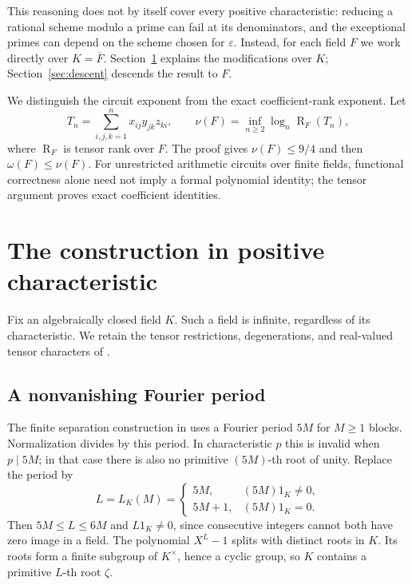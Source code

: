 \documentclass[11pt]{article}
\theoremstyle{remark}
\DeclareMathOperator{\rank}{R}
\newcommand{\eps}{\varepsilon}
\numberwithin{equation}{section}
\begin{document}
This reasoning does not by itself cover every positive characteristic:
reducing a rational scheme modulo a prime can fail at its denominators,
and the exceptional primes can depend on the scheme chosen for $\eps$.
Instead, for each field $F$ we work directly over $K=\overline F$.
Section~\ref{sec:closed} explains the modifications over $K$;
Section~\ref{sec:descent} descends the result to $F$.

We distinguish the circuit exponent from the exact coefficient-rank
exponent. Let
\[
T_n=\sum_{i,j,k=1}^{n}x_{ij}y_{jk}z_{ki},\qquad
\nu(F)=\inf_{n\geq2}\log_n\rank_F(T_n),
\]
where $\rank_F$ is tensor rank over $F$. The proof gives
$\nu(F)\leq9/4$ and then $\omega(F)\leq\nu(F)$. For unrestricted
arithmetic circuits over finite fields, functional correctness alone
need not imply a formal polynomial identity; the tensor argument proves
exact coefficient identities.

\section{The construction in positive characteristic}\label{sec:closed}

Fix an algebraically closed field $K$. Such a field is infinite,
regardless of its characteristic. We retain the tensor restrictions,
degenerations, and real-valued tensor characters of \cite{OAI}.

\subsection{A nonvanishing Fourier period}

The finite separation construction in \cite[Proposition~3.1]{OAI}
uses a Fourier period $5M$ for $M\geq1$ blocks. Normalization divides
by this period. In characteristic $p$ this is invalid when $p\mid5M$;
in that case there is also no primitive $(5M)$-th root of unity.
Replace the period by
\begin{equation}\label{eq:period}
L=L_K(M)=
\begin{cases}
5M,&(5M)1_K\ne0,\\
5M+1,&(5M)1_K=0.
\end{cases}
\end{equation}
Then $5M\leq L\leq6M$ and $L1_K\ne0$, since consecutive integers
cannot both have zero image in a field. The polynomial $X^L-1$ splits
with distinct roots in $K$. Its roots form a finite subgroup of
$K^\times$, hence a cyclic group, so $K$ contains a primitive
$L$-th root $\zeta$.
\end{document}
